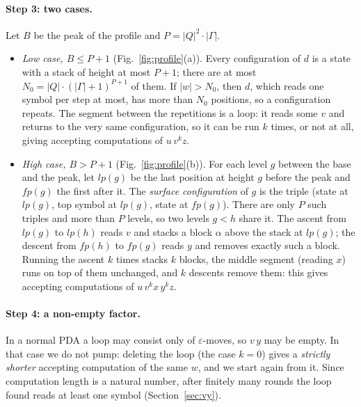 \documentclass[runningheads]{llncs}
\newcommand{\kG}{\ensuremath{\Gamma}}   %
\begin{document}
\paragraph{Step 3: two cases.} Let $B$ be the peak of the profile and
$P = |Q|^{2}\cdot|\kG|$.
\begin{itemize}
\item \emph{Low case, $B \leq P+1$} (Fig.~\ref{fig:profile}(a)). Every
  configuration of $d$ is a state with a stack of height at most $P+1$; there
  are at most $N_0 = |Q|\cdot(|\kG|+1)^{P+1}$ of them. If $|w| > N_0$, then
  $d$, which reads one symbol per step at most, has more than $N_0$ positions, so
  a configuration repeats. The segment between the repetitions is a loop: it reads
  some $v$ and returns to the very same configuration, so it can be run $k$ times,
  or not at all, giving accepting computations of $u\,v^{k}z$.
\item \emph{High case, $B > P+1$} (Fig.~\ref{fig:profile}(b)). For each level
  $g$ between the base and the peak, let $\mathit{lp}(g)$ be the last position
  at height $g$ before the peak and $\mathit{fp}(g)$ the first after it. The
  \emph{surface configuration} of $g$ is the triple (state at $\mathit{lp}(g)$,
  top symbol at $\mathit{lp}(g)$, state at $\mathit{fp}(g)$). There are only $P$
  such triples and more than $P$ levels, so two levels $g < h$ share it. The
  ascent from $\mathit{lp}(g)$ to $\mathit{lp}(h)$ reads $v$ and stacks a block
  $\alpha$ above the stack at $\mathit{lp}(g)$; the descent from
  $\mathit{fp}(h)$ to $\mathit{fp}(g)$ reads $y$ and removes exactly such a
  block. Running the ascent $k$ times stacks $k$ blocks, the middle segment
  (reading $x$) runs on top of them unchanged, and $k$ descents remove them: this
  gives accepting computations of $u\,v^{k}x\,y^{k}z$.
\end{itemize}

\paragraph{Step 4: a non-empty factor.} In a normal PDA a loop may consist only
of $\varepsilon$-moves, so $v\,y$ may be empty. In that case we do not pump:
deleting the loop (the case $k=0$) gives a \emph{strictly shorter} accepting
computation of the same $w$, and we start again from it. Since computation
length is a natural number, after finitely many rounds the loop found reads at
least one symbol (Section~\ref{sec:vy}).
\end{document}
